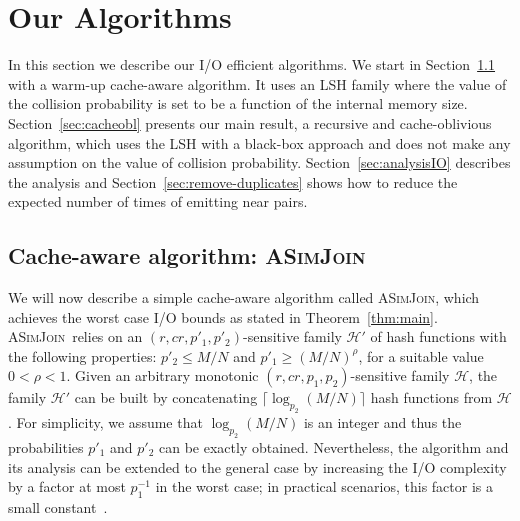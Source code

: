 \documentclass{llncs}
\newcommand{\ASimJoin}{\textsc{ASimJoin}}
\begin{document}
\section{Our Algorithms}\label{sec:OurAlgorithms}

In this section we describe our I/O efficient algorithms.
We start in Section~\ref{sec:simple} with a warm-up cache-aware algorithm. It  uses an LSH family where the value of the collision probability is set to be a function of the internal memory size.
Section~\ref{sec:cacheobl} presents our main result, a recursive and cache-oblivious algorithm, which uses the LSH with a black-box approach and does not make any assumption on the value of collision probability. 
Section~\ref{sec:analysisIO} describes the analysis and Section~\ref{sec:remove-duplicates} shows how to reduce the expected number of times of emitting near pairs. 

\subsection{Cache-aware algorithm: \ASimJoin\ }\label{sec:simple}

We will now describe a simple cache-aware algorithm called \ASimJoin, which achieves the {worst case} I/O bounds as stated in Theorem~\ref{thm:main}. 
\ASimJoin\ relies on an $(r,cr,p'_1,p'_2)$-sensitive family $\mathcal H'$ of hash functions with the following properties: $p'_2 \leq M/N$ and $p'_1 \geq (M/N)^\rho$, for a suitable value $0 < \rho < 1$. 
Given an arbitrary monotonic $(r,cr,p_1,p_2)$-sensitive family $\mathcal H$, the family $\mathcal H'$ can be built by concatenating $\lceil \log_{p_2}(M/N)\rceil $ hash functions from $\mathcal H$. 
For simplicity, we assume that $\log_{p_2}(M/N)$ is an integer and thus the probabilities $p'_1$ and $p'_2$ can be exactly obtained. 
Nevertheless, the algorithm and its analysis can be extended to the general case by increasing the I/O complexity by a factor at most $p_1^{-1}$ in the worst case; in practical scenarios, this factor is a small constant~\cite{Broder_NETWORK97,Datar_SOCG04,Gionis_VLDB99}.
\end{document}
